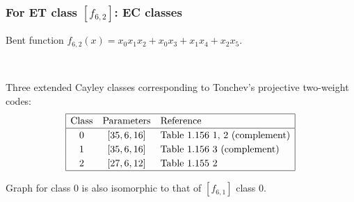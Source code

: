 \documentclass[pdf,sprung,slideColor,nocolorBG]{beamer}
\newenvironment{colortheme}[1]{
\def\ProvidesPackageRCS $##1${\relax}
\renewcommand{\ProcessOptions}{\relax}
\makeatletter

\makeatother
}{}
\begin{document}
\begin{colortheme}{jubata}
\begin{frame}
\begin{figure}
\begin{minipage}{.48\textwidth}
  \label{fig:6_1_bent_cayley_graph_index_matrix}
\end{minipage}
\end{figure}
\end{frame}
\begin{frame}
\frametitle{For ET class $[f_{6,2}]$: EC classes}

Bent function
$f_{6,2}(x) = x_{0} x_{1} x_{2} + x_{0} x_{3} + x_{1} x_{4} + x_{2} x_{5}$.

~

Three extended Cayley classes corresponding to Tonchev's projective two-weight codes:
\begin{align*}
\def\arraystretch{1.2}
\begin{array}{|ccl|}
\hline
\text{Class} &
\text{Parameters} & \text{Reference}
\\
\hline
0 & [35,6,16] & \text{Table 1.156 1, 2 (complement)}
\\
1 & [35,6,16] & \text{Table 1.156 3 (complement)}
\\
2 & [27,6,12] & \text{Table 1.155 2 }
\\
\hline
\end{array}
\end{align*}

Graph for class 0 is also isomorphic to that of $[f_{6,1}]$ class 0.


\end{frame}
\end{colortheme}
\end{document}
